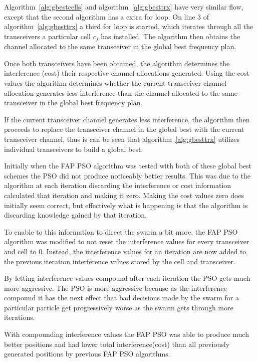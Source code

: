 Algorithm~\ref{alg:gbestcells} and algorithm~\ref{alg:gbesttrx} have very similar flow, except that the second algorithm has a extra for loop. On line 3 of algorithm~\ref{alg:gbesttrx} a third for loop is started, which iterates through all the transceivers a particular cell $c_j$ has installed. The algorithm then obtains the channel allocated to the same transceiver in the global best frequency plan.

Once both transceivers have been obtained, the algorithm determines the interference (cost) their respective channel allocations generated. Using the cost values the algorithm determines whether the current transceiver channel allocation generates less interference than the channel allocated to the same transceiver in the global best frequency plan.

If the current transceiver channel generates less interference, the algorithm then proceeds to replace the transceiver channel in the global best with the current transceiver channel, thus is can be seen that algorithm~\ref{alg:gbesttrx} utilizes individual transceivers to build a global best.

Initially when the FAP PSO algorithm was tested with both of these global best schemes the PSO did not produce noticeably better results. This was due to the algorithm at each iteration discarding the interference or cost information calculated that iteration and making it zero. Making the cost values zero does initially seem correct, but effectively what is happening is that the algorithm is discarding knowledge gained by that iteration.

To enable to this information to direct the swarm a bit more, the FAP PSO algorithm was modified to not reset the interference values for every transceiver and cell to 0. Instead, the interference values for an iteration are now added to the previous iteration interference values stored by the cell and transceiver. 

By letting interference values compound after each iteration the PSO gets much more aggressive. The PSO is more aggressive because as the interference compound it has the next effect that bad decisions made by the swarm for a particular particle get progressively worse as the swarm gets through more iterations.

With compounding interference values the FAP PSO was able to produce much better positions and had lower total interference(cost) than all previously generated positions by previous FAP PSO algorithms. 

